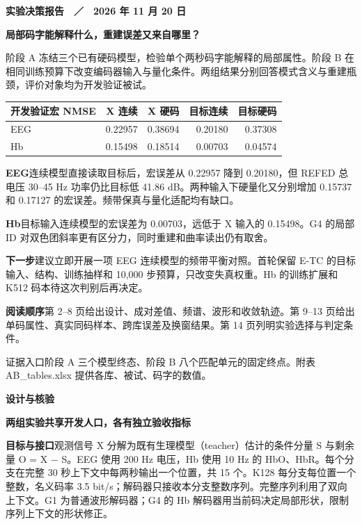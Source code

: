 \documentclass[11pt,a4paper,fontset=none]{ctexart}
\newcommand{\kicker}[1]{{\small\color{teal}\bfseries #1}\par}
\newcommand{\titleline}[1]{{\fontsize{20}{27}\selectfont\bfseries\color{ink}#1}\par\vspace{2mm}}
\newcommand{\topic}[1]{{\bfseries\color{teal}#1}\quad}
\newcommand{\src}[1]{\vfill{\footnotesize\color{gray}证据入口\quad #1}\par}
\begin{document}
\color{ink}

\kicker{实验决策报告　／　2026 年 11 月 20 日}

\titleline{局部码字能解释什么，重建误差又来自哪里？}

阶段 A 冻结三个已有硬码模型，检验单个两秒码字能解释的局部属性。阶段 B 在相同训练预算下改变编码器输入与量化条件。两组结果分别回答模式含义与重建瓶颈，评价对象均为开发验证被试。

\begin{center}\small\begin{tabular}{lrrrr}
\toprule
开发验证宏 NMSE & X 连续 & X 硬码 & 目标连续 & 目标硬码 \\
\midrule
EEG & 0.22957 & 0.38694 & 0.20180 & 0.37308 \\
Hb & 0.15498 & 0.18514 & 0.00703 & 0.04574 \\
\bottomrule\end{tabular}\end{center}

\topic{EEG}连续模型直接读取目标后，宏误差从 0.22957 降到 0.20180，但 REFED 总电压 30–45 Hz 功率仍比目标低 41.86 dB。两种输入下硬量化又分别增加 0.15737 和 0.17127 的宏误差。频带保真与量化适配均有缺口。

\topic{Hb}目标输入连续模型的宏误差为 0.00703，远低于 X 输入的 0.15498。G4 的局部 ID 对双色团斜率更有区分力，同时重建和曲率读出仍有取舍。

\topic{下一步}建议立即开展一项 EEG 连续模型的频带平衡对照。首轮保留 E-TC 的目标输入、结构、训练抽样和 10,000 步预算，只改变失真权重。Hb 的训练扩展和 K512 码本待这次判别后再决定。

\topic{阅读顺序}第 2–8 页给出设计、成对差值、频谱、波形和收敛轨迹。第 9–13 页给出单码属性、真实同码样本、跨库误差及换窗结果。第 14 页列明实验选择与判定条件。

\src{阶段 A 三个模型终态、阶段 B 八个匹配单元的固定终点。附表 AB\_tables.xlsx 提供各库、被试、码字的数值。}

\newpage

\kicker{设计与核验}

\titleline{两组实验共享开发人口，各有独立验收指标}

\topic{目标与接口}观测信号 X 分解为既有生理模型（teacher）估计的条件分量 S 与剩余量 O = X − S。EEG 使用 200 Hz 电压，Hb 使用 10 Hz 的 HbO、HbR。每个分支在完整 30 秒上下文中每两秒输出一个位置，共 15 个。K128 每分支每位置一个整数，名义码率 3.5 bit/s；解码器只接收本分支整数序列。完整序列利用了双向上下文。G1 为普通波形解码器；G4 的 Hb 解码器用当前码决定局部形状，限制序列上下文的形状修正。
\end{document}
